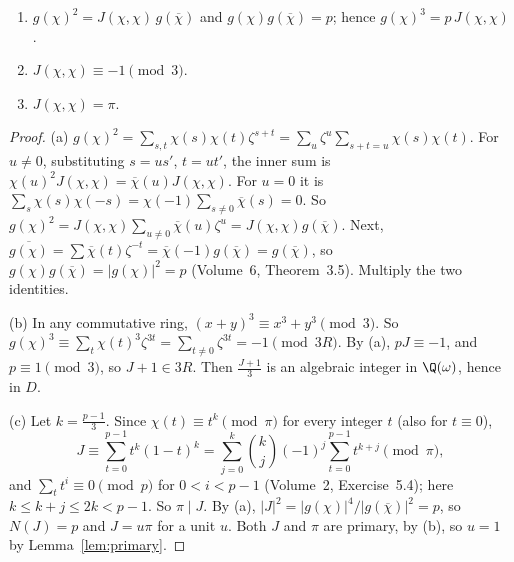 \begin{lemma}\label{lem:jacobi}
\begin{enumerate}[label=(\alph*)]
\item $g(\chi)^2=J(\chi,\chi)\,g(\overline{\chi})$ and $g(\chi)g(\overline{\chi})=p$; hence $g(\chi)^3=p\,J(\chi,\chi)$.
\item $J(\chi,\chi)\equiv-1\pmod 3$.
\item $J(\chi,\chi)=\pi$.
\end{enumerate}
\end{lemma}
\begin{proof}
(a) $g(\chi)^2=\sum_{s,t}\chi(s)\chi(t)\zeta^{s+t}=\sum_u\zeta^u\sum_{s+t=u}\chi(s)\chi(t)$. For $u\ne0$, substituting $s=us'$, $t=ut'$, the inner sum is
$\chi(u)^2J(\chi,\chi)=\overline{\chi}(u)J(\chi,\chi)$. For $u=0$ it is $\sum_s\chi(s)\chi(-s)=\chi(-1)\sum_{s\ne0}\overline{\chi}(s)=0$. So $g(\chi)^2=J(\chi,\chi)
\sum_{u\ne0}\overline{\chi}(u)\zeta^u=J(\chi,\chi)g(\overline{\chi})$. Next, $\overline{g(\chi)}=\sum\overline{\chi}(t)\zeta^{-t}=\overline{\chi}(-1)g(\overline{\chi})=
g(\overline{\chi})$, so $g(\chi)g(\overline{\chi})=|g(\chi)|^2=p$ (Volume~6, Theorem~3.5). Multiply the two identities.

(b) In any commutative ring, $(x+y)^3\equiv x^3+y^3\pmod3$. So $g(\chi)^3\equiv\sum_t\chi(t)^3\zeta^{3t}=\sum_{t\ne0}\zeta^{3t}=-1\pmod{3R}$. By (a), $pJ\equiv-1$,
and $p\equiv1\pmod3$, so $J+1\in3R$. Then $\frac{J+1}3$ is an algebraic integer in $\Q(\omega)$, hence in $D$.

(c) Let $k=\frac{p-1}3$. Since $\chi(t)\equiv t^k\pmod\pi$ for every integer $t$ (also for $t\equiv0$),
\[
J\equiv\sum_{t=0}^{p-1}t^k(1-t)^k=\sum_{j=0}^k\binom kj(-1)^j\sum_{t=0}^{p-1}t^{k+j}\pmod\pi,
\]
and $\sum_tt^i\equiv0\pmod p$ for $0<i<p-1$ (Volume~2, Exercise~5.4); here $k\le k+j\le2k<p-1$. So $\pi\mid J$. By (a), $|J|^2=|g(\chi)|^4/|g(\overline{\chi})|^2=p$, so
$N(J)=p$ and $J=u\pi$ for a unit $u$. Both $J$ and $\pi$ are primary, by (b), so $u=1$ by Lemma~\ref{lem:primary}.
\end{proof}

